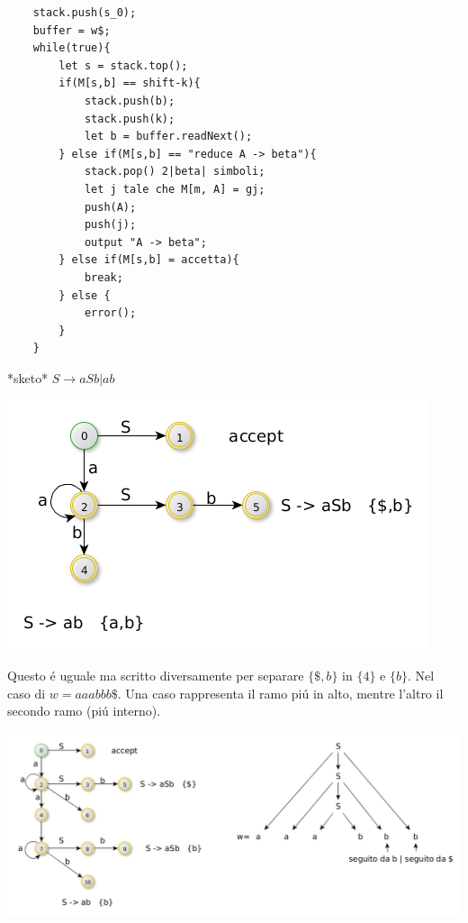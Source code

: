 \begin{lstlisting}
    stack.push(s_0);
    buffer = w$;
    while(true){
        let s = stack.top();
        if(M[s,b] == shift-k){
            stack.push(b);
            stack.push(k);
            let b = buffer.readNext(); 
        } else if(M[s,b] == "reduce A -> beta"){
            stack.pop() 2|beta| simboli;
            let j tale che M[m, A] = gj;
            push(A);
            push(j);
            output "A -> beta";
        } else if(M[s,b] = accetta){
            break;
        } else {
            error();
        }
    }
\end{lstlisting}

*sketo*
$S \rightarrow aSb | ab $

\begin{center}
    \includegraphics[scale=0.6]{Chapters/Img/c02_15.png}\\
\end{center} 

Questo \'e uguale ma scritto diversamente per separare $\{ \$, b\}$ in $\{4\}$ e $\{b\}$. Nel caso di $w=aaabbb\$$. Una caso rappresenta
il ramo pi\'u in alto, mentre l'altro il secondo ramo (pi\'u interno).

\begin{center}
    \includegraphics[scale=0.45]{Chapters/Img/c02_16.png}\\
\end{center} 

